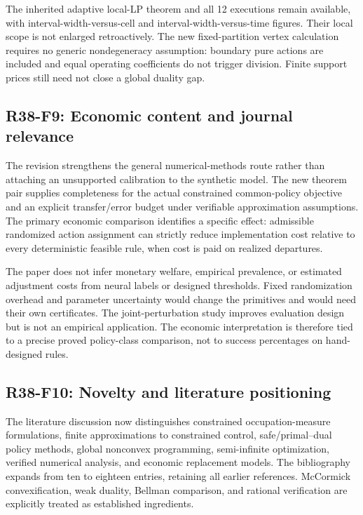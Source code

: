 The inherited adaptive local-LP theorem and all 12 executions remain available, with interval-width-versus-cell and interval-width-versus-time figures. Their local scope is not enlarged retroactively. The new fixed-partition vertex calculation requires no generic nondegeneracy assumption: boundary pure actions are included and equal operating coefficients do not trigger division. Finite support prices still need not close a global duality gap.

\subsection{R38-F9: Economic content and journal relevance}
The revision strengthens the general numerical-methods route rather than attaching an unsupported calibration to the synthetic model. The new theorem pair supplies completeness for the actual constrained common-policy objective and an explicit transfer/error budget under verifiable approximation assumptions. The primary economic comparison identifies a specific effect: admissible randomized action assignment can strictly reduce implementation cost relative to every deterministic feasible rule, when cost is paid on realized departures.

The paper does not infer monetary welfare, empirical prevalence, or estimated adjustment costs from neural labels or designed thresholds. Fixed randomization overhead and parameter uncertainty would change the primitives and would need their own certificates. The joint-perturbation study improves evaluation design but is not an empirical application. The economic interpretation is therefore tied to a precise proved policy-class comparison, not to success percentages on hand-designed rules.

\subsection{R38-F10: Novelty and literature positioning}
The literature discussion now distinguishes constrained occupation-measure formulations, finite approximations to constrained control, safe/primal--dual policy methods, global nonconvex programming, semi-infinite optimization, verified numerical analysis, and economic replacement models. The bibliography expands from ten to eighteen entries, retaining all earlier references. McCormick convexification, weak duality, Bellman comparison, and rational verification are explicitly treated as established ingredients.

